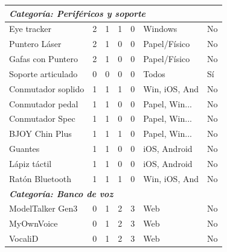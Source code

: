 \begin{small}
\begin{longtable}{p{4cm}cccc p{4cm} l}
    \multicolumn{7}{l}{\textit{\textbf{Categoría: Periféricos y soporte}}} \\
    \midrule
    Eye tracker & 2 & 1 & 1 & 0 & Windows & No \\
    Puntero Láser & 2 & 1 & 0 & 0 & Papel/Físico & No \\
    Gafas con Puntero & 2 & 1 & 0 & 0 & Papel/Físico & No \\
    Soporte articulado & 0 & 0 & 0 & 0 & Todos & Sí \\
    Conmutador soplido & 1 & 1 & 1 & 0 & Win, iOS, And & No \\
    Conmutador pedal & 1 & 1 & 0 & 0 & Papel, Win... & No \\
    Conmutador Spec & 1 & 1 & 0 & 0 & Papel, Win... & No \\
    BJOY Chin Plus & 1 & 1 & 1 & 0 & Papel, Win... & No \\
    Guantes & 1 & 1 & 0 & 0 & iOS, Android & No \\
    Lápiz táctil & 1 & 1 & 0 & 0 & iOS, Android & No \\
    Ratón Bluetooth & 1 & 1 & 1 & 0 & Win, iOS, And & No \\
    \midrule

    \multicolumn{7}{l}{\textit{\textbf{Categoría: Banco de voz}}} \\
    \midrule
    ModelTalker Gen3 & 0 & 1 & 2 & 3 & Web & No \\
    MyOwnVoice & 0 & 1 & 2 & 3 & Web & No \\
    VocaliD & 0 & 1 & 2 & 3 & Web & No \\
\end{longtable}
\end{small}